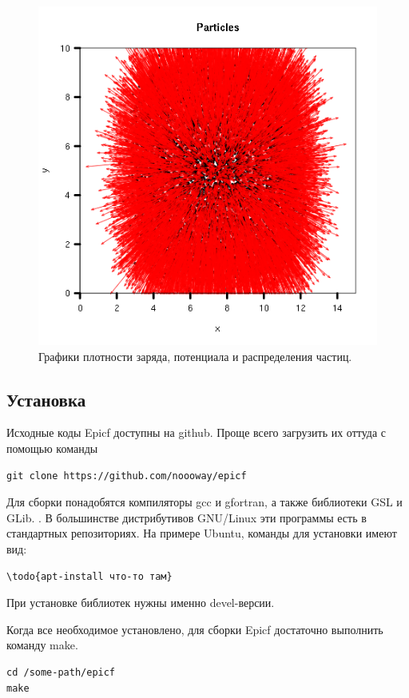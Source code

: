 \begin{figure}[h]
  \includegraphics[scale=0.3]{./figs/out0001_particles.png}
  \caption{
    Графики плотности заряда, потенциала и распределения частиц.
  }
\end{figure}

\subsection{ Установка }
Исходные коды Epicf доступны на github. 
Проще всего загрузить их оттуда с помощью команды
\begin{verbatim}
git clone https://github.com/noooway/epicf
\end{verbatim}

Для сборки понадобятся компиляторы gcc и gfortran, а также библиотеки GSL и GLib. .
В большинстве дистрибутивов GNU/Linux эти программы есть в стандартных репозиториях.
На примере Ubuntu, команды для установки имеют вид:
\begin{verbatim}
\todo{apt-install что-то там}
\end{verbatim}
При установке библиотек нужны именно devel-версии.

Когда все необходимое установлено, для сборки Epicf достаточно 
выполнить команду make.
\begin{verbatim}
cd /some-path/epicf
make
\end{verbatim}

